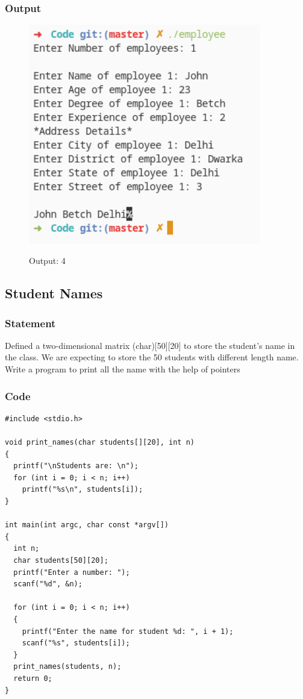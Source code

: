 \subsubsection{Output}
\begin{figure}[!htb]
  \centering
  \includegraphics[width=4in]{Images/employee.png}
  \label{output:4}
  \caption{Output: 4}
\end{figure}


\pagebreak
\subsection{Student Names}

\subsubsection{Statement}
Defined a two-dimensional matrix (char)[50][20] to store the student’s name in the class.
We are expecting to store the 50 students with different length name. Write a program to print all
the name with the help of pointers

\subsubsection{Code}
\begin{verbatim} 
#include <stdio.h>

void print_names(char students[][20], int n)
{
  printf("\nStudents are: \n");
  for (int i = 0; i < n; i++)
    printf("%s\n", students[i]);
}

int main(int argc, char const *argv[])
{
  int n;
  char students[50][20];
  printf("Enter a number: ");
  scanf("%d", &n);

  for (int i = 0; i < n; i++)
  {
    printf("Enter the name for student %d: ", i + 1);
    scanf("%s", students[i]);
  }
  print_names(students, n);
  return 0;
}

\end{verbatim}
